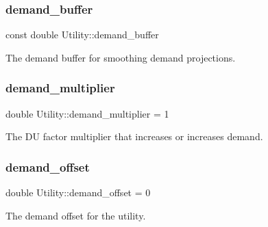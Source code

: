 \mbox{\label{classUtility_a4be9760339ec06e5c932890da8e566b3}} 
\subsubsection{\texorpdfstring{demand\+\_\+buffer}{demand\_buffer}}
{\footnotesize\ttfamily const double Utility\+::demand\+\_\+buffer}



The demand buffer for smoothing demand projections. 

\mbox{\label{classUtility_ad1de23b261a8a1b6db86651d48b7abcd}} 
\subsubsection{\texorpdfstring{demand\+\_\+multiplier}{demand\_multiplier}}
{\footnotesize\ttfamily double Utility\+::demand\+\_\+multiplier = 1\hspace{0.3cm}{\ttfamily [private]}}



The DU factor multiplier that increases or increases demand. 

\mbox{\label{classUtility_ab6711489e4242a1871a8ed80066920eb}} 
\subsubsection{\texorpdfstring{demand\+\_\+offset}{demand\_offset}}
{\footnotesize\ttfamily double Utility\+::demand\+\_\+offset = 0\hspace{0.3cm}{\ttfamily [private]}}



The demand offset for the utility. 

